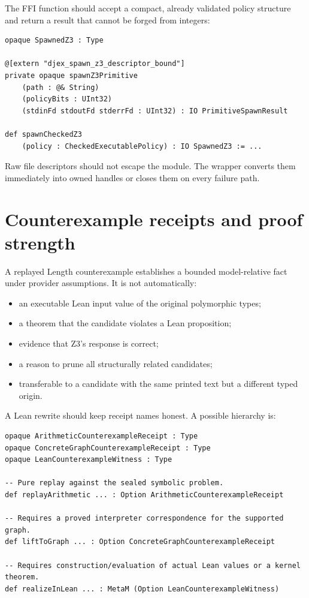 \documentclass[10pt,letterpaper,oneside]{report}
\newcommand{\code}[1]{\texttt{\detokenize{#1}}}
\begin{document}
The FFI function should accept a compact, already validated policy structure and return a result that cannot be forged from integers:

\begin{lstlisting}[language=Leanish]
opaque SpawnedZ3 : Type

@[extern "djex_spawn_z3_descriptor_bound"]
private opaque spawnZ3Primitive
    (path : @& String)
    (policyBits : UInt32)
    (stdinFd stdoutFd stderrFd : UInt32) : IO PrimitiveSpawnResult

def spawnCheckedZ3
    (policy : CheckedExecutablePolicy) : IO SpawnedZ3 := ...
\end{lstlisting}

Raw file descriptors should not escape the module. The wrapper converts them immediately into owned handles or closes them on every failure path.

\section{Counterexample receipts and proof strength}

A replayed Length counterexample establishes a bounded model-relative fact under provider assumptions. It is not automatically:

\begin{itemize}
  \item an executable Lean input value of the original polymorphic types;
  \item a theorem that the candidate violates a Lean proposition;
  \item evidence that Z3's \code{unsat} response is correct;
  \item a reason to prune all structurally related candidates;
  \item transferable to a candidate with the same printed text but a different typed origin.
\end{itemize}

A Lean rewrite should keep receipt names honest. A possible hierarchy is:

\begin{lstlisting}[language=Leanish]
opaque ArithmeticCounterexampleReceipt : Type
opaque ConcreteGraphCounterexampleReceipt : Type
opaque LeanCounterexampleWitness : Type

-- Pure replay against the sealed symbolic problem.
def replayArithmetic ... : Option ArithmeticCounterexampleReceipt

-- Requires a proved interpreter correspondence for the supported graph.
def liftToGraph ... : Option ConcreteGraphCounterexampleReceipt

-- Requires construction/evaluation of actual Lean values or a kernel theorem.
def realizeInLean ... : MetaM (Option LeanCounterexampleWitness)
\end{lstlisting}
\end{document}
